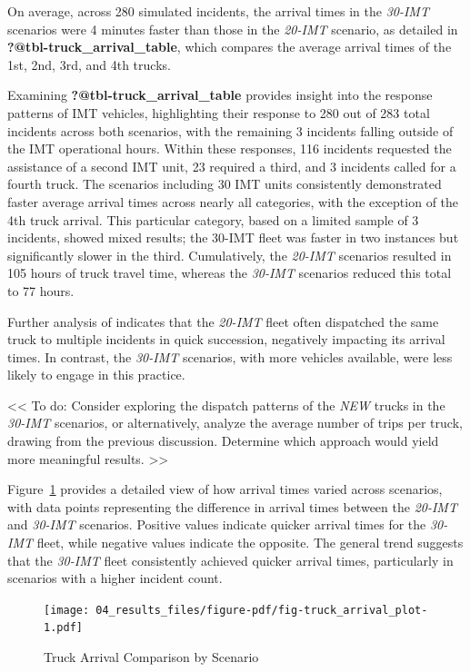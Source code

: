 \documentclass[
  letterpaper,
  authoryear]{elsarticle}
\begin{document}
On average, across 280 simulated incidents, the arrival times in the
\emph{30-IMT} scenarios were 4 minutes faster than those in the
\emph{20-IMT} scenario, as detailed in
\textbf{?@tbl-truck\_arrival\_table}, which compares the average arrival
times of the 1st, 2nd, 3rd, and 4th trucks.

Examining \textbf{?@tbl-truck\_arrival\_table} provides insight into the
response patterns of IMT vehicles, highlighting their response to 280
out of 283 total incidents across both scenarios, with the remaining 3
incidents falling outside of the IMT operational hours. Within these
responses, 116 incidents requested the assistance of a second IMT unit,
23 required a third, and 3 incidents called for a fourth truck. The
scenarios including 30 IMT units consistently demonstrated faster
average arrival times across nearly all categories, with the exception
of the 4th truck arrival. This particular category, based on a limited
sample of 3 incidents, showed mixed results; the 30-IMT fleet was faster
in two instances but significantly slower in the third. Cumulatively,
the \emph{20-IMT} scenarios resulted in 105 hours of truck travel time,
whereas the \emph{30-IMT} scenarios reduced this total to 77 hours.

Further analysis of \citet{truck_arrival_data} indicates that the
\emph{20-IMT} fleet often dispatched the same truck to multiple
incidents in quick succession, negatively impacting its arrival times.
In contrast, the \emph{30-IMT} scenarios, with more vehicles available,
were less likely to engage in this practice.

\textless\textless{} To do: Consider exploring the dispatch patterns of
the \emph{NEW} trucks in the \emph{30-IMT} scenarios, or alternatively,
analyze the average number of trips per truck, drawing from the previous
discussion. Determine which approach would yield more meaningful
results. \textgreater\textgreater{}

Figure~\ref{fig-truck_arrival_plot} provides a detailed view of how
arrival times varied across scenarios, with data points representing the
difference in arrival times between the \emph{20-IMT} and \emph{30-IMT}
scenarios. Positive values indicate quicker arrival times for the
\emph{30-IMT} fleet, while negative values indicate the opposite. The
general trend suggests that the \emph{30-IMT} fleet consistently
achieved quicker arrival times, particularly in scenarios with a higher
incident count.

\begin{figure}

{\centering \texttt{[image: 04\_results\_files/figure-pdf/fig-truck\_arrival\_plot-1.pdf]}

}

\caption{\label{fig-truck_arrival_plot}Truck Arrival Comparison by
Scenario}

\end{figure}
\end{document}
